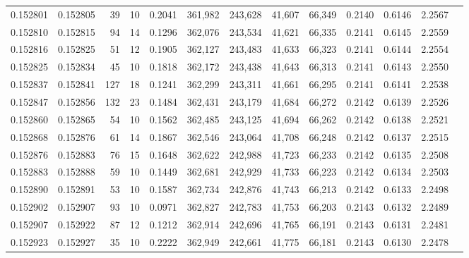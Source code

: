 \begin{tabular}{rrrrrrrrrrrrr}
0.152801 & 0.152805 &    39 &  10 &                                     0.2041 & 361,982 & 243,628 &  41,607 &  66,349 & 0.2140 & 0.6146 & 2.2567 \\
0.152810 & 0.152815 &    94 &  14 &                                     0.1296 & 362,076 & 243,534 &  41,621 &  66,335 & 0.2141 & 0.6145 & 2.2559 \\
0.152816 & 0.152825 &    51 &  12 &                                     0.1905 & 362,127 & 243,483 &  41,633 &  66,323 & 0.2141 & 0.6144 & 2.2554 \\
0.152825 & 0.152834 &    45 &  10 &                                     0.1818 & 362,172 & 243,438 &  41,643 &  66,313 & 0.2141 & 0.6143 & 2.2550 \\
0.152837 & 0.152841 &   127 &  18 &                                     0.1241 & 362,299 & 243,311 &  41,661 &  66,295 & 0.2141 & 0.6141 & 2.2538 \\
0.152847 & 0.152856 &   132 &  23 &                                     0.1484 & 362,431 & 243,179 &  41,684 &  66,272 & 0.2142 & 0.6139 & 2.2526 \\
0.152860 & 0.152865 &    54 &  10 &                                     0.1562 & 362,485 & 243,125 &  41,694 &  66,262 & 0.2142 & 0.6138 & 2.2521 \\
0.152868 & 0.152876 &    61 &  14 &                                     0.1867 & 362,546 & 243,064 &  41,708 &  66,248 & 0.2142 & 0.6137 & 2.2515 \\
0.152876 & 0.152883 &    76 &  15 &                                     0.1648 & 362,622 & 242,988 &  41,723 &  66,233 & 0.2142 & 0.6135 & 2.2508 \\
0.152883 & 0.152888 &    59 &  10 &                                     0.1449 & 362,681 & 242,929 &  41,733 &  66,223 & 0.2142 & 0.6134 & 2.2503 \\
0.152890 & 0.152891 &    53 &  10 &                                     0.1587 & 362,734 & 242,876 &  41,743 &  66,213 & 0.2142 & 0.6133 & 2.2498 \\
0.152902 & 0.152907 &    93 &  10 &                                     0.0971 & 362,827 & 242,783 &  41,753 &  66,203 & 0.2143 & 0.6132 & 2.2489 \\
0.152907 & 0.152922 &    87 &  12 &                                     0.1212 & 362,914 & 242,696 &  41,765 &  66,191 & 0.2143 & 0.6131 & 2.2481 \\
0.152923 & 0.152927 &    35 &  10 &                                     0.2222 & 362,949 & 242,661 &  41,775 &  66,181 & 0.2143 & 0.6130 & 2.2478 \\

\end{tabular}
